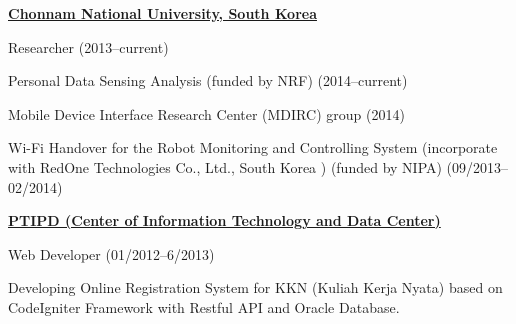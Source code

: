\documentclass[10pt]{article}
\begin{document}
\href{http://global.jnu.ac.kr/}{\textbf{Chonnam National University, South Korea }}
\begin{outerlist}
\item[] Researcher \hfill(2013--current)
	\begin{innerlist}
	\item Personal Data Sensing Analysis (funded by NRF) \hfill(2014--current)
	\item Mobile Device Interface Research Center (MDIRC) group \hfill(2014)
	\item Wi-Fi Handover for the Robot Monitoring and Controlling System (incorporate with RedOne Technologies Co., Ltd., South Korea ) (funded by NIPA) \hfill(09/2013--02/2014)
	\end{innerlist}
\end{outerlist}

\vspace{.1in}



\href{http://it.uin-suka.ac.id/}{\textbf{PTIPD (Center of Information Technology and Data Center)  }}
\begin{outerlist}
	\item[] Web Developer \hfill(01/2012--6/2013)
	\begin{innerlist}
		\item Developing Online Registration System for KKN (Kuliah Kerja Nyata) based on CodeIgniter Framework with Restful API and Oracle Database.
	\end{innerlist}
\end{outerlist}
\end{document}
